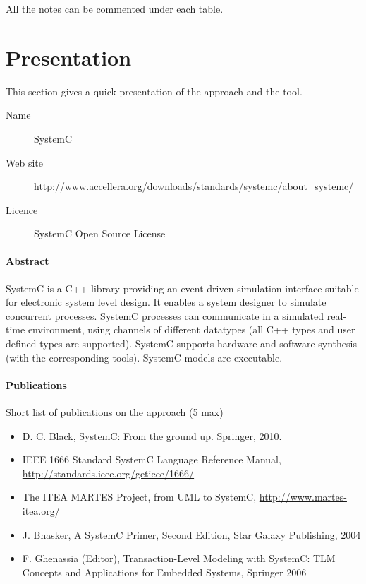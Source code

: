 All the notes can be commented under each table.

\section{Presentation}

This section gives a quick presentation of the approach and the tool.

\begin{description}
\item[Name] SystemC
\item[Web site] \url{http://www.accellera.org/downloads/standards/systemc/about_systemc/}
\item[Licence] SystemC Open Source License
\end{description}

\paragraph{Abstract}

SystemC is a C++ library providing an event-driven simulation interface suitable for electronic system level design. It enables a system designer to simulate concurrent processes. SystemC processes can communicate in a simulated real-time environment, using channels of different datatypes (all C++ types and user defined types are supported). SystemC supports hardware and software synthesis (with the corresponding tools). SystemC models are executable.


\paragraph{Publications} Short list of publications on the approach (5 max)

\begin{itemize}
\item D. C. Black, SystemC: From the ground up. Springer, 2010.
\item IEEE 1666 Standard SystemC Language Reference Manual, \url{http://standards.ieee.org/getieee/1666/}
\item The ITEA MARTES Project, from UML to SystemC, \url{http://www.martes-itea.org/}
\item J. Bhasker, A SystemC Primer, Second Edition, Star Galaxy Publishing, 2004
\item F. Ghenassia (Editor), Transaction-Level Modeling with SystemC: TLM Concepts and Applications for Embedded Systems, Springer 2006
\end{itemize}

